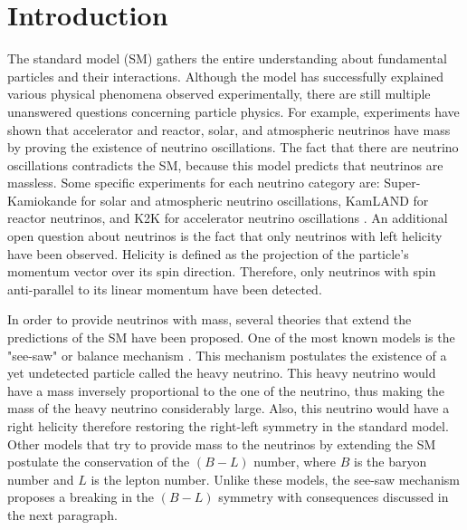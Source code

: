 \chapter{Introduction} \label{chap: Introduction}

The standard model (SM) gathers the entire understanding about fundamental particles and their interactions. Although the model has successfully explained various physical phenomena observed experimentally, there are still multiple unanswered questions concerning particle physics. For example, experiments \cite{Detectores} have shown that accelerator and reactor, solar, and atmospheric neutrinos have mass by proving the existence of neutrino oscillations. The fact that there are neutrino oscillations contradicts the SM, because this model predicts that neutrinos are massless. Some specific experiments for each neutrino category are: Super-Kamiokande \cite{Super-Kamiokande} for solar and atmospheric neutrino oscillations, KamLAND \cite{KamLAND} for reactor neutrinos, and K2K \cite{K2K} for accelerator neutrino oscillations \cite{Experimentos}. An additional open question about neutrinos is the fact that only neutrinos with left helicity have been observed. Helicity is defined as the projection of the particle's momentum vector over its spin direction. Therefore, only neutrinos with spin anti-parallel to its linear momentum have been detected.

In order to provide neutrinos with mass, several theories that extend the predictions of the SM have been proposed. One of the most known models is the "see-saw" or balance mechanism \cite{See-saw}. This mechanism postulates the existence of a yet undetected particle called the heavy neutrino. This heavy neutrino would have a mass inversely proportional to the one of the neutrino, thus making the mass of the heavy neutrino considerably large. Also, this neutrino would have a right helicity therefore restoring the right-left symmetry in the standard model. Other models that try to provide mass to the neutrinos by extending the SM postulate the conservation of the $(B-L)$ number, where $B$ is the baryon number and $L$ is the lepton number. Unlike these models, the see-saw mechanism proposes a breaking in the $(B-L)$ symmetry with consequences discussed in the next paragraph.

